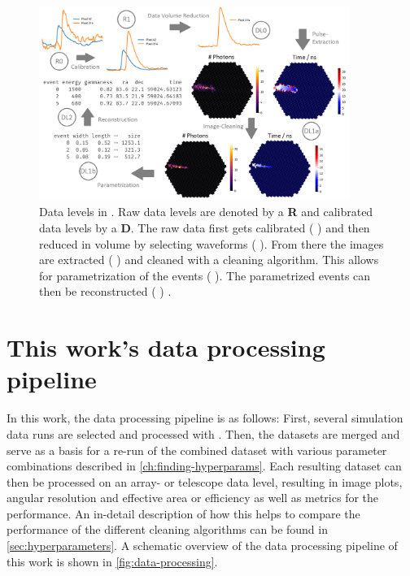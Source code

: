 \begin{figure}
    \centering
    \includegraphics[width=0.9\textwidth]{graphics/ctapipe.png}
    \caption{Data levels in \ctapipe{}. Raw data levels are denoted by a \textbf{R} and calibrated
    data levels by a \textbf{D}. The raw data first gets calibrated (\rzero{} \rightarrow \rone{})
    and then reduced in volume by selecting waveforms (\rone{} \rightarrow \dlz{}). From there the
    images are extracted (\dlz{} \rightarrow \dloa{}) and cleaned with a cleaning algorithm. This
    allows for parametrization of the events (\dloa{} \rightarrow \dlob{}). The parametrized events
    can then be reconstructed (\dlob{} \rightarrow \dlt{}) \cite{noethe_thesis, hackfeld}. }
    \label{fig:ctapipe}
\end{figure}

\section{This work's data processing pipeline}
\label{sec:pipeline}

In this work, the data processing pipeline is as follows: First, several simulation data runs are
selected and processed with \ctapipe{}. Then, the datasets are merged and serve as a basis for a re-run
of the combined dataset with various parameter combinations described in \autoref{ch:finding-hyperparams}.
Each resulting dataset can then be processed on an array- or telescope data level, resulting in
\dloa{} image plots, angular resolution and effective area or efficiency as well as metrics for the
performance. An in-detail description of how this helps to compare the performance of the different
cleaning algorithms can be found in \autoref{sec:hyperparameters}. A schematic overview of the data
processing pipeline of this work is shown in \autoref{fig:data-processing}.

